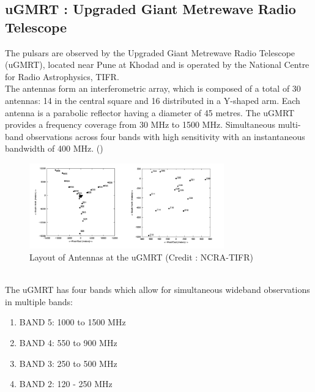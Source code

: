 \documentclass{article}
\begin{document}
\subsection{uGMRT : Upgraded Giant Metrewave Radio Telescope}
The pulsars are observed by the Upgraded Giant Metrewave Radio Telescope (uGMRT), located near Pune at Khodad and is operated by the National Centre for Radio Astrophysics, TIFR.\\
The antennas form an interferometric array, which is composed of a total of 30 antennas: 14 in the central square and 16 distributed in a Y-shaped arm.
Each antenna is a parabolic reflector having a diameter of 45 metres.
The uGMRT provides a frequency coverage from 30 MHz to 1500 MHz. Simultaneous multi-band observations across four bands with high sensitivity with an instantaneous bandwidth of 400 MHz. (\cite{10.2307/26293915})
\begin{figure}[htbp]
\begin{center}
\includegraphics[width=0.75\textwidth]{Images/V2_1.png}
\caption{Layout of Antennas at the uGMRT (Credit : NCRA-TIFR)}
\end{center}
\end{figure}
\\
The uGMRT has four bands which allow for simultaneous wideband observations in multiple bands:
\begin{enumerate}
    \item BAND 5: 1000 to 1500 MHz
    \item BAND 4: 550 to 900 MHz
    \item BAND 3: 250 to 500 MHz
    \item BAND 2: 120 - 250 MHz
\end{enumerate}
\end{document}
